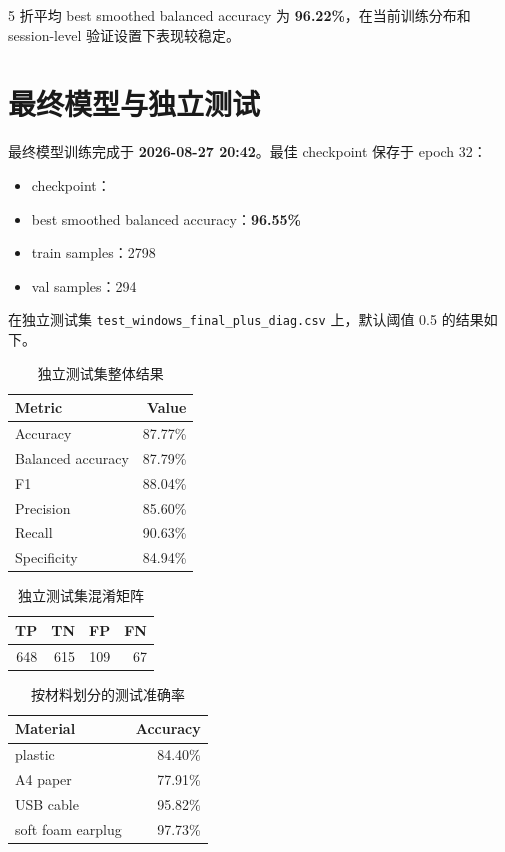 \documentclass[UTF8,a4paper,11pt]{ctexart}
\begin{document}
5 折平均 best smoothed balanced accuracy 为 \textbf{96.22\%}，在当前训练分布和 session-level 验证设置下表现较稳定。

\section{最终模型与独立测试}

最终模型训练完成于 \textbf{2026-08-27 20:42}。最佳 checkpoint 保存于 epoch 32：

\begin{itemize}
  \item checkpoint：
  \item best smoothed balanced accuracy：\textbf{96.55\%}
  \item train samples：2798
  \item val samples：294
\end{itemize}

在独立测试集 \texttt{test\_windows\_final\_plus\_diag.csv} 上，默认阈值 0.5 的结果如下。

\begin{table}[h]
\centering
\caption{独立测试集整体结果}
\begin{tabular}{lr}
\toprule
Metric & Value \\
\midrule
Accuracy & 87.77\% \\
Balanced accuracy & 87.79\% \\
F1 & 88.04\% \\
Precision & 85.60\% \\
Recall & 90.63\% \\
Specificity & 84.94\% \\
\bottomrule
\end{tabular}
\end{table}

\begin{table}[h]
\centering
\caption{独立测试集混淆矩阵}
\begin{tabular}{rrrr}
\toprule
TP & TN & FP & FN \\
\midrule
648 & 615 & 109 & 67 \\
\bottomrule
\end{tabular}
\end{table}

\begin{table}[h]
\centering
\caption{按材料划分的测试准确率}
\begin{tabular}{lr}
\toprule
Material & Accuracy \\
\midrule
plastic & 84.40\% \\
A4 paper & 77.91\% \\
USB cable & 95.82\% \\
soft foam earplug & 97.73\% \\
\bottomrule
\end{tabular}
\end{table}
\end{document}
